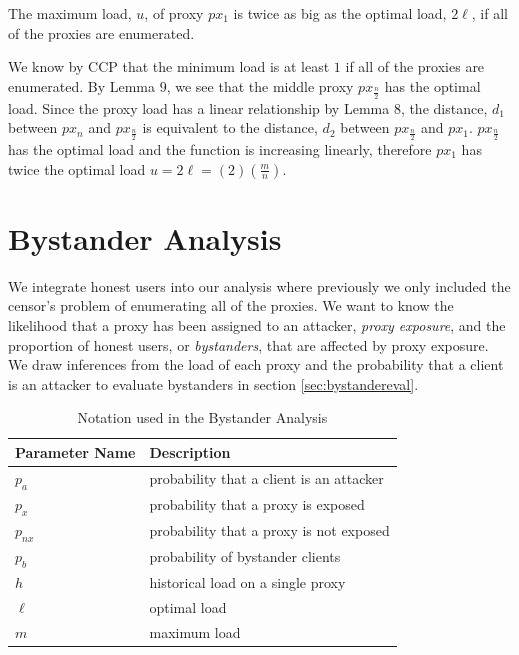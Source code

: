 \begin{theorem}{The maximum load, $u$, of proxy $px_1$ is twice as big as the optimal load, $2\ell$, if all of the proxies are enumerated.}

We know by CCP that the minimum load is at least $1$ if all of the proxies are enumerated. By Lemma $9$, we see that the middle proxy $px_{\frac{n}{2}}$ has the optimal load. Since the proxy load has a linear relationship by Lemma $8$, the distance, $d_1$ between $px_n$ and $px_{\frac{n}{2}}$ is equivalent to the distance, $d_2$ between $px_{\frac{n}{2}}$ and $px_1$. $px_{\frac{n}{2}}$ has the optimal load and the function is increasing linearly, therefore $px_{1}$ has twice the optimal load $u = 2\ell =(2)(\frac{m}{n})$.

\end{theorem}

\section{Bystander Analysis}
\label{sec:bystander}

We integrate honest users into our analysis where previously we only included the censor's problem of enumerating all of the proxies. We want to know the likelihood that a proxy has been assigned to an attacker, \textit{proxy exposure}, and the proportion of honest users, or \textit{bystanders}, that are affected by proxy exposure. We draw inferences from the load of each proxy and the probability that a client is an attacker to evaluate bystanders in section \ref{sec:bystandereval}.

\begin{table}[h]
  \centering
	\begin{tabular}{ll}
	\hline
	\cline{1-2}
	Parameter Name    & Description  \\
	\hline
    $p_a$       & probability that a client is an attacker\\
    $p_x$     & probability that a proxy is exposed \\
    $p_{nx}$     & probability that a proxy is not exposed \\
    $p_b$     & probability of bystander clients\\
	$h$     & historical load on a single proxy  \\
	$\ell$     & optimal load \\
	$m$     & maximum load \\

	\hline
	\end{tabular}
  \caption{Notation used in the Bystander Analysis}
  \label{tab:vars}
\end{table}

